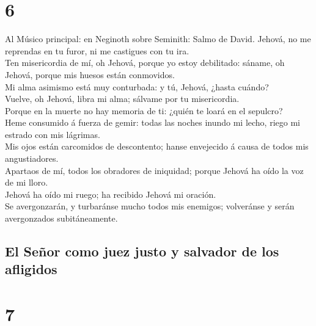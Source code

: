 \hypertarget{section-5}{%
\section{6}\label{section-5}}

 Al Músico principal: en Neginoth sobre Seminith: Salmo de
David. Jehová, no me reprendas en tu furor, ni me castigues con tu
ira.\\
 Ten misericordia de mí, oh Jehová, porque yo estoy
debilitado: sáname, oh Jehová, porque mis huesos están conmovidos.\\
 Mi alma asimismo está muy conturbada: y tú, Jehová,
¿hasta cuándo?\\
 Vuelve, oh Jehová, libra mi alma; sálvame por tu
misericordia.\\
 Porque en la muerte no hay memoria de ti: ¿quién te loará
en el sepulcro?\\
 Heme consumido á fuerza de gemir: todas las noches inundo
mi lecho, riego mi estrado con mis lágrimas.\\
 Mis ojos están carcomidos de descontento; hanse
envejecido á causa de todos mis angustiadores.\\
 Apartaos de mí, todos los obradores de iniquidad; porque
Jehová ha oído la voz de mi lloro.\\
 Jehová ha oído mi ruego; ha recibido Jehová mi oración.\\
 Se avergonzarán, y turbaránse mucho todos mis enemigos;
volveránse y serán avergonzados subitáneamente.

\hypertarget{el-seuxf1or-como-juez-justo-y-salvador-de-los-afligidos}{%
\subsection{El Señor como juez justo y salvador de los
afligidos}\label{el-seuxf1or-como-juez-justo-y-salvador-de-los-afligidos}}

\hypertarget{section-6}{%
\section{7}\label{section-6}}

